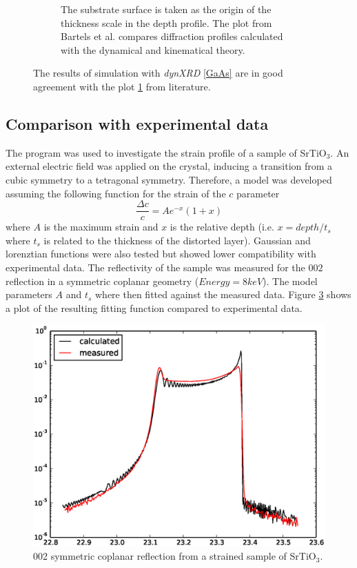 \documentclass[12pt,oneside,notitlepage,abstracton,a4paper]{scrartcl}
\begin{document}
\begin{figure}[h]
\begin{subfigure}[h]{0.50\textwidth}
  \caption{The substrate surface is taken as the origin of the thickness scale in the depth profile. The plot from Bartels et al. \cite{Bartels:a25435} compares diffraction profiles calculated with the dynamical and kinematical theory.}
  \label{GaAs_article}
 \end{subfigure}
  \caption{The results of simulation with \textit{dynXRD} \ref{GaAs} are in good agreement with the plot \ref{GaAs_article} from literature.
}\label{GaAs_both}
\end{figure}


\subsection{Comparison with experimental data}\label{data}
The program was used to investigate the strain profile of a sample of SrTiO$ _3$. An external electric field was applied on the crystal, inducing a transition from a cubic symmetry to a tetragonal symmetry\cite{PhysRevB.88.024104}. Therefore, a model was developed assuming the following function for the strain of the $c$ parameter
\begin{equation}
 \frac{\Delta c}{c}=A e^{-x}(1+x)
\end{equation}
where $A$ is the maximum strain and $x$ is the relative depth (i.e. $x=depth/t_s$ where $t_s$ is related to the thickness of the distorted layer). Gaussian and lorenztian functions were also tested but showed lower compatibility with experimental data.
The reflectivity of the sample was measured for the $002$ reflection in a symmetric coplanar geometry ($Energy=8 keV$).
The model parameters $A$ and $t_s$ where then fitted against the measured data. Figure \ref{SrTiO3_2} shows a plot of the resulting fitting function compared to experimental data.



\begin{figure}[h]
\begin{center}
\includegraphics[width=\textwidth]{pics/SrTiO3_2.eps}
\caption{002 symmetric coplanar reflection from a strained sample of SrTiO$ _3$.}
\label{SrTiO3_2}
\end{center}
\end{figure}
\end{document}
